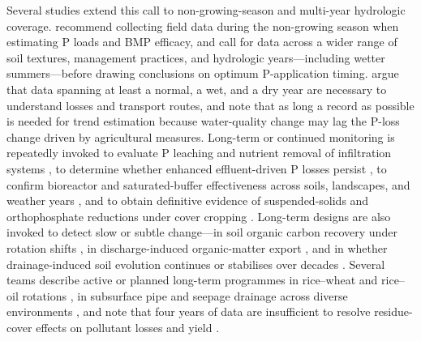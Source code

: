 Several studies extend this call to non-growing-season and multi-year hydrologic coverage. \textcite{VanEsbroeck2016} recommend collecting field data during the non-growing season when estimating P loads and BMP efficacy, and call for data across a wider range of soil textures, management practices, and hydrologic years---including wetter summers---before drawing conclusions on optimum P-application timing. \textcite{vanderSalm2012} argue that data spanning at least a normal, a wet, and a dry year are necessary to understand losses and transport routes, and \textcite{Ulén2007} note that as long a record as possible is needed for trend estimation because water-quality change may lag the P-loss change driven by agricultural measures. Long-term or continued monitoring is repeatedly invoked to evaluate P leaching and nutrient removal of infiltration systems \parencite{Duan2015}, to determine whether enhanced effluent-driven P losses persist \parencite{Monaghan2004}, to confirm bioreactor and saturated-buffer effectiveness across soils, landscapes, and weather years \parencite{Jaynes2019}, and to obtain definitive evidence of suspended-solids and orthophosphate reductions under cover cropping \parencite{SalcedaGonzalez2025}. Long-term designs are also invoked to detect slow or subtle change---in soil organic carbon recovery under rotation shifts \parencite{Kumar2014}, in discharge-induced organic-matter export \parencite{Manninen2023}, and in whether drainage-induced soil evolution continues or stabilises over decades \parencite{Frison2009}. Several teams describe active or planned long-term programmes in rice--wheat and rice--oil rotations \parencite{Qi2025b}, in subsurface pipe and seepage drainage across diverse environments \parencite{Liu2025b,Liu2025c}, and note that four years of data are insufficient to resolve residue-cover effects on pollutant losses and yield \parencite{Thoma2005,Acharya2019b}.

